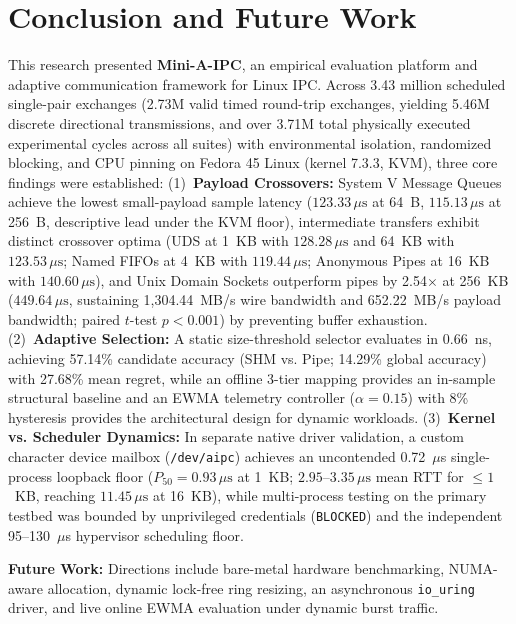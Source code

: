 \clearpage
\balance

\section{Conclusion and Future Work}
\label{sec:conclusion}

This research presented \textbf{Mini-A-IPC}, an empirical evaluation platform and adaptive communication framework for Linux IPC. Across 3.43 million scheduled single-pair exchanges (2.73M valid timed round-trip exchanges, yielding 5.46M discrete directional transmissions, and over 3.71M total physically executed experimental cycles across all suites) with environmental isolation, randomized blocking, and CPU pinning on Fedora 45 Linux (kernel 7.3.3, KVM), three core findings were established:
(1)~\textbf{Payload Crossovers:} System V Message Queues achieve the lowest small-payload sample latency ($123.33\,\mu\text{s}$ at 64~B, $115.13\,\mu\text{s}$ at 256~B, descriptive lead under the KVM floor), intermediate transfers exhibit distinct crossover optima (UDS at 1~KB with $128.28\,\mu\text{s}$ and 64~KB with $123.53\,\mu\text{s}$; Named FIFOs at 4~KB with $119.44\,\mu\text{s}$; Anonymous Pipes at 16~KB with $140.60\,\mu\text{s}$), and Unix Domain Sockets outperform pipes by 2.54$\times$ at 256~KB ($449.64\,\mu\text{s}$, sustaining 1,304.44~MB/s wire bandwidth and 652.22~MB/s payload bandwidth; paired $t$-test $p < 0.001$) by preventing buffer exhaustion.
(2)~\textbf{Adaptive Selection:} A static size-threshold selector evaluates in 0.66~ns, achieving 57.14\% candidate accuracy (SHM vs. Pipe; 14.29\% global accuracy) with 27.68\% mean regret, while an offline 3-tier mapping provides an in-sample structural baseline and an EWMA telemetry controller ($\alpha=0.15$) with 8\% hysteresis provides the architectural design for dynamic workloads.
(3)~\textbf{Kernel vs. Scheduler Dynamics:} In separate native driver validation, a custom character device mailbox (\texttt{/dev/aipc}) achieves an uncontended 0.72~$\mu$s single-process loopback floor ($P_{50} = 0.93\,\mu\text{s}$ at 1~KB; $2.95\text{--}3.35\,\mu\text{s}$ mean RTT for $\le 1$~KB, reaching $11.45\,\mu\text{s}$ at 16~KB), while multi-process testing on the primary testbed was bounded by unprivileged credentials (\texttt{BLOCKED}) and the independent 95--130~$\mu$s hypervisor scheduling floor.

\textbf{Future Work:} Directions include bare-metal hardware benchmarking, NUMA-aware allocation, dynamic lock-free ring resizing, an asynchronous \texttt{io\_uring} driver, and live online EWMA evaluation under dynamic burst traffic.

